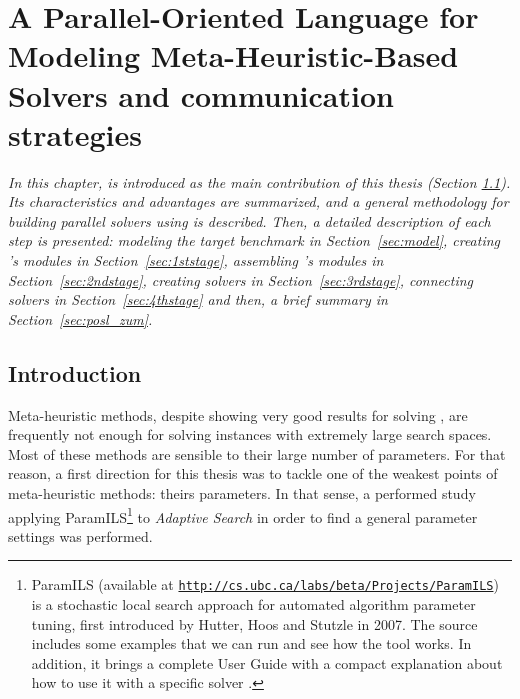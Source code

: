 \chapter[\posl{}: Parallel Oriented Solver~Language]{A Parallel-Oriented Language for Modeling Meta-Heuristic-Based Solvers and communication strategies}
\label{chap:posl}
\textit{In this chapter, \posl{} is introduced as the main contribution of this thesis (Section \ref{sec:posl_intro}). Its characteristics and advantages are summarized, and a general methodology for building parallel solvers using \posl{} is described. Then, a detailed description of each step is presented: modeling the target benchmark in Section~\ref{sec:model}, creating \posl's modules in Section~\ref{sec:1ststage}, assembling \posl's modules in Section~\ref{sec:2ndstage}, creating \posl{} solvers in Section~\ref{sec:3rdstage}, connecting solvers in Section~\ref{sec:4thstage} and then, a brief summary in Section~\ref{sec:posl_zum}.}
\vfill
\minitoc
\newpage

\section{Introduction}
\label{sec:posl_intro}

Meta-heuristic methods, despite showing very good results for solving \CSPs, are frequently not enough for solving instances with extremely large search spaces. Most of these methods are sensible to their large number of parameters. For that reason, a first direction for this thesis was to tackle one of the weakest points of meta-heuristic methods: theirs parameters. In that sense, a performed study applying {\sc ParamILS}\footnote{{\sc ParamILS} (available at \href{http://cs.ubc.ca/labs/beta/Projects/ParamILS}{\texttt{http://cs.ubc.ca/labs/beta/Projects/ParamILS}}) is a stochastic local search approach for automated algorithm parameter tuning, first introduced by Hutter, Hoos and St\:utzle in 2007. The source includes some examples that we can run and see how the tool works. In addition, it brings a complete User Guide with a compact explanation about how to use it with a specific solver \cite{Hutter2008,Hutter2009}.} to {\it Adaptive Search} in order to find a general parameter settings was performed. 

